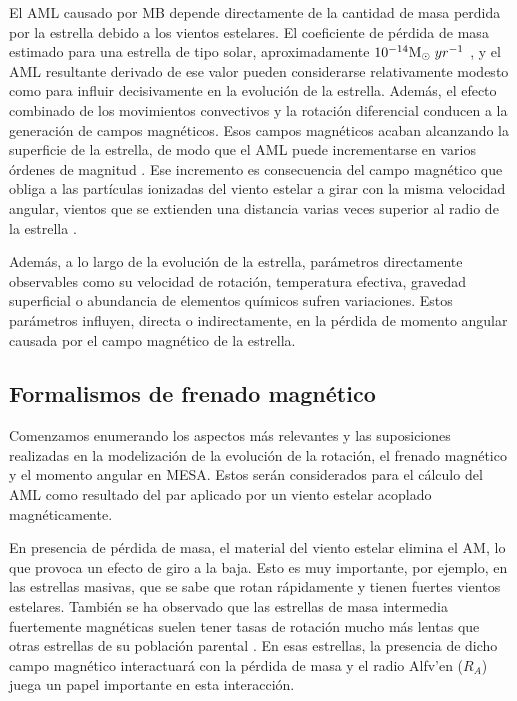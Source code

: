 El AML causado por MB depende directamente de la cantidad de masa perdida por la estrella debido a los vientos estelares. El coeficiente de pérdida de masa estimado para una estrella de tipo solar, aproximadamente $10^{-14}\mathrm{M}_\odot \; yr^{-1}$ \cite{Noerdlinger2008}, y el AML resultante derivado de ese valor pueden considerarse relativamente modesto como para influir decisivamente en la evolución de la estrella. Además, el efecto combinado de los movimientos convectivos y la rotación diferencial conducen a la generación de campos magnéticos. Esos campos magnéticos acaban alcanzando la superficie de la estrella, de modo que el AML puede incrementarse en varios órdenes de magnitud \cite{Langer2012}. Ese incremento es consecuencia del campo magnético que obliga a las partículas ionizadas del viento estelar a girar con la misma velocidad angular, vientos que se extienden una distancia varias veces superior al radio de la estrella \cite[ver][para más detalles]{UdDoula2002,Ud-Doula2007,Ud-Doula2008}.

Además, a lo largo de la evolución de la estrella, parámetros directamente observables como su velocidad de rotación, temperatura efectiva, gravedad superficial o abundancia de elementos químicos sufren variaciones. Estos parámetros influyen, directa o indirectamente, en la pérdida de momento angular causada por el campo magnético de la estrella.\par


\subsection{Formalismos de frenado magnético} \label{mod_mb}
Comenzamos enumerando los aspectos más relevantes y las suposiciones realizadas en la modelización de la evolución de la rotación, el frenado magnético y el momento angular en MESA. Estos serán considerados para el cálculo del AML como resultado del par aplicado por un viento estelar acoplado magnéticamente.\par 

En presencia de pérdida de masa, el material del viento estelar elimina el AM, lo que provoca un efecto de giro a la baja. Esto es muy importante, por ejemplo, en las estrellas masivas, que se sabe que rotan rápidamente y tienen fuertes vientos estelares. También se ha observado que las estrellas de masa intermedia fuertemente magnéticas suelen tener tasas de rotación mucho más lentas que otras estrellas de su población parental \cite{Mathys2006}. En esas estrellas, la presencia de dicho campo magnético interactuará con la pérdida de masa y el radio Alfv'{e}n ($R_{A}$) juega un papel importante en esta interacción.\par

